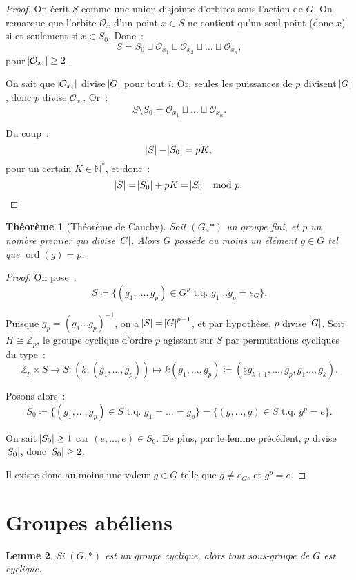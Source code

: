 \documentclass{article}
\newtheorem{thm}{Théorème}[section]
\newtheorem{lem}[thm]{Lemme}
\theoremstyle{definition}
\theoremstyle{remark}
\DeclareMathOperator{\ord}{ord}
\newcommand{\Z}{\mathbb Z}
\newcommand{\N}{\mathbb N}
\newcommand{\tq}{\text{ t.q. }}
\newcommand{\simeqq}{\cong}
\begin{document}
	\begin{proof} On écrit $S$ comme une union disjointe d'orbites sous l'action de $G$. On remarque que l'orbite $\mathcal O_x$ d'un point $x \in S$ ne
	contient qu'un seul point (donc $x$) si et seulement si $x \in S_0$. Donc~:
	\[S = S_0 \sqcup \mathcal O_{x_1} \sqcup \mathcal O_{x_2} \sqcup \ldots \sqcup \mathcal O_{x_n},\]
	pour $\abs {\mathcal O_{x_i}} \geq 2$.

	On sait que $\abs {\mathcal O_{x_i}}$ divise $\abs G$ pour tout $i$. Or, seules les puissances de $p$ divisent $\abs G$, donc $p$ divise $\mathcal O_{x_i}$.
	Or~:
	\[S \setminus S_0 = \mathcal O_{x_1} \sqcup \ldots \sqcup \mathcal O_{x_n}.\]

	Du coup~:
	\[\abs S - \abs {S_0} = pK,\]
	pour un certain $K \in \N^*$, et donc~:
	\[\abs S = \abs {S_0} + pK = \abs {S_0} \mod p.\]
	\end{proof}

	\begin{thm}[Théorème de Cauchy] Soit $(G, *)$ un groupe fini, et $p$ un nombre premier qui divise $\abs G$. Alors $G$ possède au moins un élément $g \in G$
	tel que $\ord(g) = p$.
	\end{thm}

	\begin{proof} On pose~:
	\[S \coloneqq \{(g_1, \ldots, g_p) \in G^p \tq g_1\ldots g_p = e_G\}.\]

	Puisque $g_p = (g_1\ldots g_p)^{-1}$, on a $\abs S = \abs G^{p-1}$, et par hypothèse, $p$ divise $\abs G$. Soit $H \simeqq \Z_p$, le groupe cyclique d'ordre
	$p$ agissant sur $S$ par permutations cycliques du type~:
	\[\Z_p \times S \to S : \left(k, (g_1, \ldots, g_p)\right) \mapsto k(g_1, \ldots, g_p) \coloneq \left(§g_{k+1}, \ldots, g_p, g_1\ldots, g_k\right).\]

	Posons alors~:
	\[S_0 \coloneqq \{(g_1, \ldots, g_p) \in S \tq g_1 = \ldots = g_p\} = \{(g, \ldots, g) \in S \tq g^p = e\}.\]

	On sait $\abs {S_0} \geq 1$ car $(e, \ldots, e) \in S_0$. De plus, par le lemme précédent, $p$ divise $\abs {S_0}$, donc $\abs {S_0} \geq 2$.

	Il existe donc au moins une valeur $g \in G$ telle que $g \neq e_G$, et $g^p = e$.
	\end{proof}

\section{Groupes abéliens}
	\begin{lem} Si $(G, *)$ est un groupe cyclique, alors tout sous-groupe de $G$ est cyclique.
	\end{lem}
\end{document}
